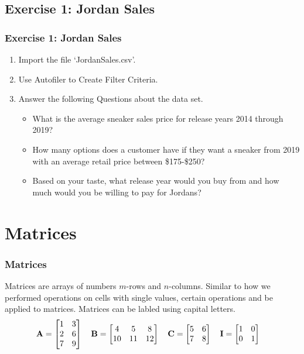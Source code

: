 \documentclass[12pt]{beamer}
\begin{document}
\subsection{Exercise 1: Jordan Sales}
	\begin{frame}
		\frametitle{Exercise 1: Jordan Sales }
		\begin{enumerate}
			\item Import the file `JordanSales.csv'.
			\item Use Autofiler to Create Filter Criteria.
			\item Answer the following Questions about the data set.
			\begin{itemize}
				\item What is the average sneaker sales price for release years 2014 through 2019?
				\item How many options does a customer have if they want a sneaker from 2019 with an average retail price between \$175-\$250?
				\item Based on your taste, what release year would you buy from and how much would you be willing to pay for Jordans?
			\end{itemize}
		\end{enumerate}
	\end{frame}
\section{Matrices}
	\begin{frame}
		\frametitle{Matrices}
		Matrices are arrays of numbers $m$-rows and $n$-columns. 
		Similar to how we performed operations on cells with single values, certain operations and be applied to matrices. 
		Matrices can be labled using capital letters.
		$$ \textbf{\text{A}} = 
			\begin{bmatrix}
				1 & 3 \\
				2 & 6 \\
				7 & 9 
			\end{bmatrix}
			\quad 
			\textbf{\text{B}} = 
			\begin{bmatrix}
				4 & 5 & 8 \\
				10 & 11 & 12 
			\end{bmatrix}
			\quad
			\textbf{\text{C}} = 
			\begin{bmatrix}
				5 & 6 \\
				7 & 8 
			\end{bmatrix}
			\quad
			\textbf{\text{I}} =
			\begin{bmatrix}
				1 & 0 \\
				0 & 1 \\
			\end{bmatrix}
			\quad
		$$
	\end{frame}
\end{document}
